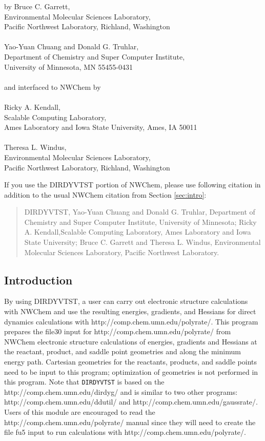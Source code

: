 by Bruce C. Garrett,\\
Environmental Molecular Sciences Laboratory,\\
Pacific Northwest Laboratory, Richland, Washington\\
\\
Yao-Yuan Chuang and Donald G. Truhlar,\\
Department of Chemistry and Super Computer Institute,\\
University of Minnesota, MN 55455-0431\\
\\
and interfaced to NWChem by\\
\\
Ricky A. Kendall,\\
Scalable Computing Laboratory,\\
Ames Laboratory and Iowa State University, Ames, IA 50011\\
\\
Theresa L. Windus,\\
Environmental Molecular Sciences Laboratory,\\
Pacific Northwest Laboratory, Richland, Washington

If you use the DIRDYVTST portion of NWChem, please use following citation
in addition to the usual NWChem citation from Section \ref{sec:intro}:
\begin{quote}
  DIRDYVTST, Yao-Yuan Chuang and Donald G. Truhlar,
  Department of Chemistry and Super Computer Institute,
  University of Minnesota; Ricky A. Kendall,Scalable Computing Laboratory,
  Ames Laboratory and Iowa State University; Bruce C. Garrett and Theresa L.
  Windus, Environmental Molecular Sciences Laboratory, Pacific Northwest
  Laboratory.
\end{quote}

\subsection{Introduction}

By using DIRDYVTST, a user can carry out electronic structure calculations
with NWChem and use the resulting energies, gradients, and Hessians for
direct dynamics calculations with 
{http://comp.chem.umn.edu/polyrate/}.
This program prepares the file30 input for 
{http://comp.chem.umn.edu/polyrate/} from NWChem
electronic structure calculations of energies, gradients and Hessians at the 
reactant, product, and saddle point geometries and along the minimum
energy path.  Cartesian geometries for the reactants, products, and 
saddle points need to be input to this program; optimization of 
geometries is not performed in this program.  Note that \verb+DIRDYVTST+ is
based on the  
{http://comp.chem.umn.edu/dirdyg/}
and is similar to two other programs: 
{http://comp.chem.umn.edu/ddutil/} and 
{http://comp.chem.umn.edu/gaussrate/}.  Users of this module are
encouraged to read the 
{http://comp.chem.umn.edu/polyrate/} manual since they will need to
create the file fu5 input to run calculations with 
{http://comp.chem.umn.edu/polyrate/}.

